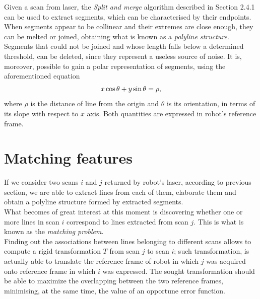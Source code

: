 \documentclass[a4paper, onecolumn]{report}
\begin{document}
Given a scan from laser, the \emph{Split and merge} algorithm described in Section 2.4.1 can be used to extract segments, which can be characterised by their endpoints. When segments appear to be collinear and their extremes are close enough, they can be melted or joined, obtaining what is known as a \emph{polyline structure}. Segments that could not be joined and whose length falls below a determined threshold, can be deleted, since they represent a useless source of noise. It is, moreover, possible to gain a polar representation of segments, using the aforementioned equation 
\begin{equation}
	x\cos \theta + y\sin\theta = \rho, \notag 
\end{equation}
where $\rho$ is the distance of line from the origin and $\theta$ is its orientation, in terms of its slope with respect to $x$ axis. Both quantities are expressed in robot's reference frame.

\section{Matching features}
If we consider two scans $i$ and $j$ returned by robot's laser, according to previous section, we are able to extract lines from each of them, elaborate them and obtain a polyline structure formed by extracted segments. \\
What becomes of great interest at this moment is discovering whether one or more lines in scan $i$ correspond to lines extracted from scan $j$. This is what is known as the \emph{matching problem}. \\
Finding out the associations between lines belonging to different scans allows to compute a rigid transformation $T$ from scan $j$ to scan $i$; such transformation, is actually able to translate the reference frame of robot in which $j$ was acquired onto reference frame in which $i$ was expressed. The sought transformation should be able to maximize the overlapping between the two reference frames, minimising, at the same time, the value of an opportune error function.
\end{document}
